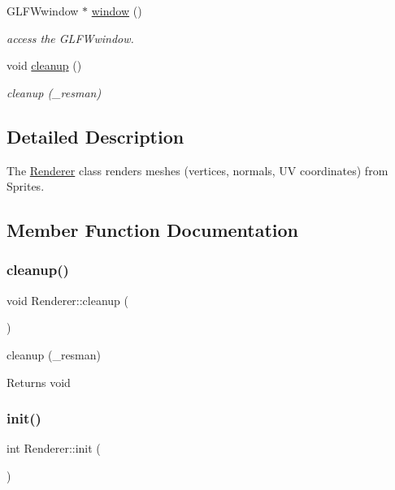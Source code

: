 \begin{DoxyCompactItemize}
G\+L\+F\+Wwindow $\ast$ \hyperlink{class_renderer_aeaa64bb33b48726eaf294827ac12bb18}{window} ()
\begin{DoxyCompactList}\small\item\em access the G\+L\+F\+Wwindow. \end{DoxyCompactList}\item 
void \hyperlink{class_renderer_a40b6ff3f5a306181f0ddc04e47462f41}{cleanup} ()
\begin{DoxyCompactList}\small\item\em cleanup (\+\_\+resman) \end{DoxyCompactList}\end{DoxyCompactItemize}


\subsection{Detailed Description}
The \hyperlink{class_renderer}{Renderer} class renders meshes (vertices, normals, UV coordinates) from Sprites. 

\subsection{Member Function Documentation}
\mbox{\label{class_renderer_a40b6ff3f5a306181f0ddc04e47462f41}} 
\subsubsection{\texorpdfstring{cleanup()}{cleanup()}}
{\footnotesize\ttfamily void Renderer\+::cleanup (\begin{DoxyParamCaption}{ }\end{DoxyParamCaption})}



cleanup (\+\_\+resman) 

\begin{DoxyReturn}{Returns}
void 
\end{DoxyReturn}
\mbox{\label{class_renderer_a609f1ee6a2e5033035eb47636d0901ad}} 
\subsubsection{\texorpdfstring{init()}{init()}}
{\footnotesize\ttfamily int Renderer\+::init (\begin{DoxyParamCaption}{ }\end{DoxyParamCaption})}



